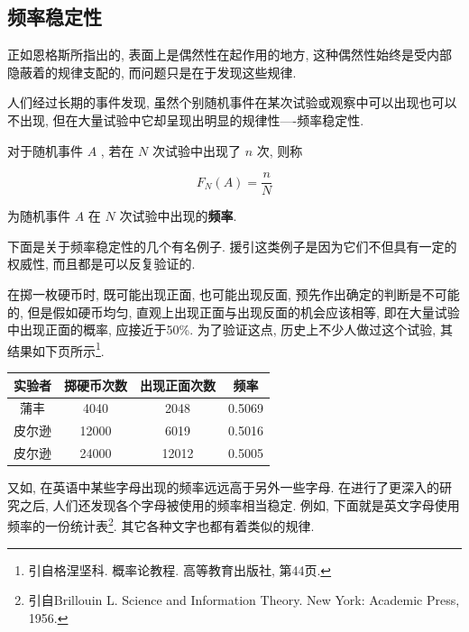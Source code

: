 \documentclass[../../main.tex]{subfiles}
\begin{document}
\subsection{频率稳定性}

正如恩格斯所指出的, 表面上是偶然性在起作用的地方, 这种偶然性始终是受内部隐蔽着的规律支配的, 而问题只是在于发现这些规律. 

人们经过长期的事件发现, 虽然个别随机事件在某次试验或观察中可以出现也可以不出现, 但在大量试验中它却呈现出明显的规律性----频率稳定性. 

对于随机事件 $A$ , 若在 $N$ 次试验中出现了 $n$ 次, 则称

\[
    F_N(A) = \frac{n}{N}
\]

为随机事件 $A$ 在 $N$ 次试验中出现的\textbf{频率}. 

下面是关于频率稳定性的几个有名例子. 援引这类例子是因为它们不但具有一定的权威性, 而且都是可以反复验证的. 

在掷一枚硬币时, 既可能出现正面, 也可能出现反面, 预先作出确定的判断是不可能的, 但是假如硬币均匀, 直观上出现正面与出现反面的机会应该相等, 即在大量试验中出现正面的概率, 应接近于50\%. 为了验证这点, 历史上不少人做过这个试验, 其结果如下页所示\footnote{引自格涅坚科. 概率论教程. 高等教育出版社, 第44页. }. 

\begin{table}[htbp]
    \centering
    \begin{tabular}{c|c|c|c}
        \hline
        实验者 & 掷硬币次数 & 出现正面次数 & 频率 \\
        \hline
        蒲丰 & 4040 & 2048 & 0.5069 \\
        皮尔逊 & 12000 & 6019 & 0.5016 \\
        皮尔逊 & 24000 & 12012 & 0.5005 \\
        \hline
    \end{tabular}
\end{table}

又如, 在英语中某些字母出现的频率远远高于另外一些字母. 在进行了更深入的研究之后, 人们还发现各个字母被使用的频率相当稳定. 例如, 下面就是英文字母使用频率的一份统计表\footnote{引自Brillouin L. Science and Information Theory. New York: Academic Press, 1956. }. 其它各种文字也都有着类似的规律. 
\end{document}
